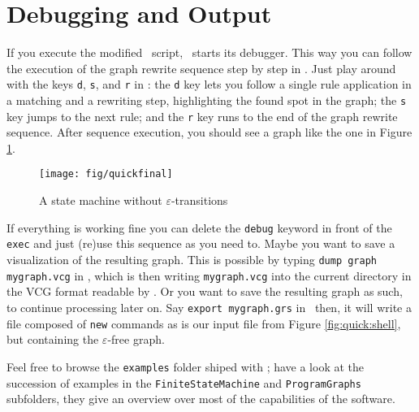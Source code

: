 \section{Debugging and Output}

If you execute the modified \GrShell\ script, \GrG\ starts its debugger.
This way you can follow the execution of the graph rewrite sequence step by step in \yComp.
Just play around with the keys \texttt{d}, \texttt{s}, and \texttt{r} in \GrShell: the \texttt{d} key lets you follow a single rule application in a matching and a rewriting step, highlighting the found spot in the graph; the \texttt{s} key jumps to the next rule; and the \texttt{r} key runs to the end of the graph rewrite sequence.
After sequence execution, you should see a graph like the one in Figure \ref{fig:quick:final}.

\begin{figure}[htbp]
	\centering
	\texttt{[image: fig/quickfinal]}
	\caption{A state machine without $\varepsilon$-transitions}
	\label{fig:quick:final}
\end{figure}

If everything is working fine you can delete the \texttt{debug} keyword in front of the \texttt{exec} and just (re)use this sequence as you need to.
Maybe you want to save a visualization of the resulting graph.
This is possible by typing \texttt{dump graph mygraph.vcg} in \GrShell,
which is then writing \texttt{mygraph.vcg} into the current directory in the VCG format readable by \yComp.
Or you want to save the resulting graph as such, to continue processing later on.
Say \texttt{export mygraph.grs} in \GrShell\ then, it will write a file composed of \texttt{new} commands as is our input file from Figure \ref{fig:quick:shell}, but containing the $\varepsilon$-free graph.

Feel free to browse the \texttt{examples} folder shiped with \GrG;
have a look at the succession of examples in the \texttt{FiniteStateMachine} and \texttt{ProgramGraphs} subfolders,
they give an overview over most of the capabilities of the software.

